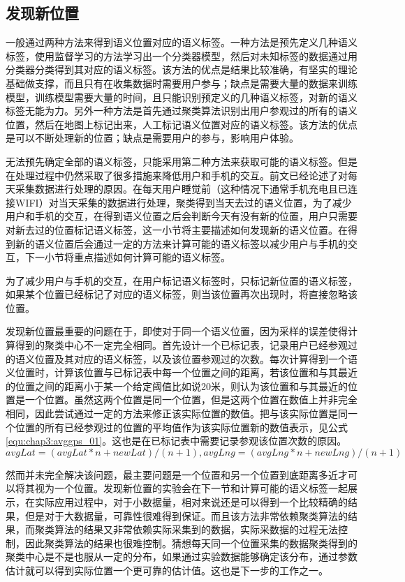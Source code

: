 \subsection{发现新位置}
一般通过两种方法来得到语义位置对应的语义标签。一种方法是预先定义几种语义标签，使用监督学习的方法学习出一个分类器模型，然后对未知标签的数据通过用分类器分类得到其对应的语义标签。该方法的优点是结果比较准确，有坚实的理论基础做支撑，而且只有在收集数据时需要用户参与；缺点是需要大量的数据来训练模型，训练模型需要大量的时间，且只能识别预定义的几种语义标签，对新的语义标签无能为力。另外一种方法是首先通过聚类算法识别出用户参观过的所有的语义位置，然后在地图上标记出来，人工标记语义位置对应的语义标签。该方法的优点是可以不断处理新的位置；缺点是需要用户的参与，影响用户体验。
\par 无法预先确定全部的语义标签，只能采用第二种方法来获取可能的语义标签。但是在处理过程中仍然采取了很多措施来降低用户和手机的交互。前文已经论述了对每天采集数据进行处理的原因。在每天用户睡觉前（这种情况下通常手机充电且已连接WIFI）对当天采集的数据进行处理，聚类得到当天去过的语义位置，为了减少用户和手机的交互，在得到语义位置之后会判断今天有没有新的位置，用户只需要对新去过的位置标记语义标签，这一小节将主要描述如何发现新的语义位置。在得到新的语义位置后会通过一定的方法来计算可能的语义标签以减少用户与手机的交互，下一小节将重点描述如何计算可能的语义标签。
\par 为了减少用户与手机的交互，在用户标记语义标签时，只标记新位置的语义标签，如果某个位置已经标记了对应的语义标签，则当该位置再次出现时，将直接忽略该位置。
\par 发现新位置最重要的问题在于，即使对于同一个语义位置，因为采样的误差使得计算得到的聚类中心不一定完全相同。首先设计一个已标记表，记录用户已经参观过的语义位置及其对应的语义标签，以及该位置参观过的次数。每次计算得到一个语义位置时，计算该位置与已标记表中每一个位置之间的距离，若该位置和与其最近的位置之间的距离小于某一个给定阈值比如说20米，则认为该位置和与其最近的位置是一个位置。虽然这两个位置是同一个位置，但是这两个位置在数值上并非完全相同，因此尝试通过一定的方法来修正该实际位置的数值。把与该实际位置是同一个位置的所有已经参观过的位置的平均值作为该实际位置新的数值表示，见公式\ref{equ:chap3:avggps_01}。这也是在已标记表中需要记录参观该位置次数的原因。
\begin{equation}
\label{equ:chap3:avggps_01}
avgLat = (avgLat\ast n+newLat)/(n+1),avgLng = (avgLng\ast n+newLng)/(n+1)
\end{equation}
\par 然而并未完全解决该问题，最主要问题是一个位置和另一个位置到底距离多近才可以将其视为一个位置。发现新位置的实验会在下一节和计算可能的语义标签一起展示，在实际应用过程中，对于小数据量，相对来说还是可以得到一个比较精确的结果，但是对于大数据量，可靠性很难得到保证。而且该方法非常依赖聚类算法的结果，而聚类算法的结果又非常依赖实际采集到的数据，实际采数据的过程无法控制，因此聚类算法的结果也很难控制。猜想每天同一个位置采集的数据聚类得到的聚类中心是不是也服从一定的分布，如果通过实验数据能够确定该分布，通过参数估计就可以得到实际位置一个更可靠的估计值。这也是下一步的工作之一。
